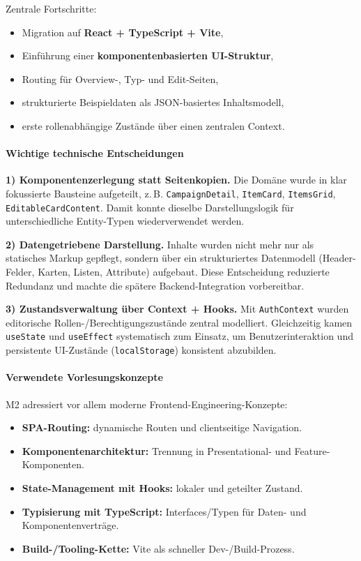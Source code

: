 Zentrale Fortschritte:
\begin{itemize}
  \item Migration auf \textbf{React + TypeScript + Vite},
  \item Einführung einer \textbf{komponentenbasierten UI-Struktur},
  \item Routing für Overview-, Typ- und Edit-Seiten,
  \item strukturierte Beispieldaten als JSON-basiertes Inhaltsmodell,
  \item erste rollenabhängige Zustände über einen zentralen Context.
\end{itemize}

\paragraph{Wichtige technische Entscheidungen}
\textbf{1) Komponentenzerlegung statt Seitenkopien.}
Die Domäne wurde in klar fokussierte Bausteine aufgeteilt, z.\,B.
\texttt{CampaignDetail}, \texttt{ItemCard}, \texttt{ItemsGrid},
\texttt{EditableCardContent}.
Damit konnte dieselbe Darstellungslogik für unterschiedliche Entity-Typen
wiederverwendet werden.

\textbf{2) Datengetriebene Darstellung.}
Inhalte wurden nicht mehr nur als statisches Markup gepflegt, sondern über ein
strukturiertes Datenmodell (Header-Felder, Karten, Listen, Attribute)
aufgebaut.
Diese Entscheidung reduzierte Redundanz und machte die spätere
Backend-Integration vorbereitbar.

\textbf{3) Zustandsverwaltung über Context + Hooks.}
Mit \texttt{AuthContext} wurden editorische Rollen-/Berechtigungszustände
zentral modelliert.
Gleichzeitig kamen \texttt{useState} und \texttt{useEffect} systematisch zum
Einsatz, um Benutzerinteraktion und persistente UI-Zustände
(\texttt{localStorage}) konsistent abzubilden.

\paragraph{Verwendete Vorlesungskonzepte}
M2 adressiert vor allem moderne Frontend-Engineering-Konzepte:
\begin{itemize}
  \item \textbf{SPA-Routing:} dynamische Routen und clientseitige Navigation.
  \item \textbf{Komponentenarchitektur:} Trennung in Presentational- und
  Feature-Komponenten.
  \item \textbf{State-Management mit Hooks:} lokaler und geteilter Zustand.
  \item \textbf{Typisierung mit TypeScript:} Interfaces/Typen für Daten- und
  Komponentenverträge.
  \item \textbf{Build-/Tooling-Kette:} Vite als schneller Dev-/Build-Prozess.
\end{itemize}


